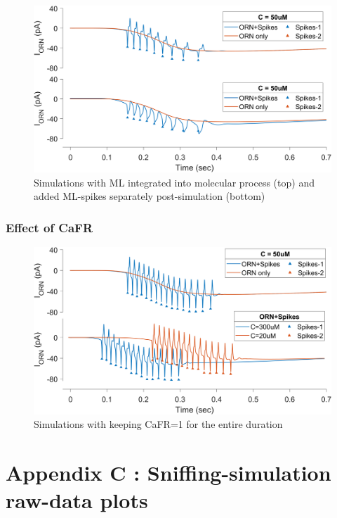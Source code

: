 \documentclass[
]{article}
\begin{document}
\begin{figure}

{\centering \includegraphics[width=0.8\linewidth]{figs/Appendix/supp_fig_ML_spikes_OVERLAP} 

}

\caption{Simulations with ML integrated into molecular process (top) and added ML-spikes separately post-simulation (bottom)}\label{fig:MLover}
\end{figure}

\hypertarget{effect-of-cafr}{%
\subsubsection*{Effect of CaFR}\label{effect-of-cafr}}

\begin{figure}

{\centering \includegraphics[width=0.8\linewidth]{figs/Appendix/supp_fig_ML_ID_w_CaFR_1} 

}

\caption{Simulations with keeping CaFR=1 for the entire duration}\label{fig:aCaFR1}
\end{figure}

\clearpage

\hypertarget{appendix-c-sniffing-simulation-raw-data-plots}{%
\section*{Appendix C : Sniffing-simulation raw-data plots}\label{appendix-c-sniffing-simulation-raw-data-plots}}
\end{document}
